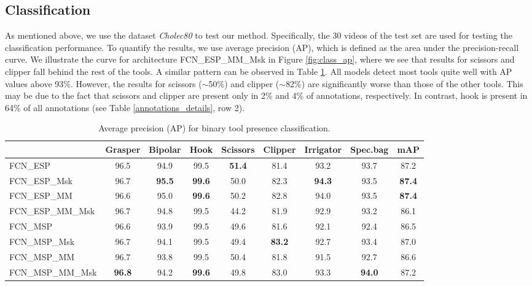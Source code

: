 \documentclass[english,runningheads,a4paper]{llncs}
\begin{document}
\subsection{Classification}
As mentioned above, we use the dataset \textit{Cholec80} to test our method. Specifically, the 30 videos of the test set are used for testing the classification performance. 
To quantify the results, we use average precision (AP), which is defined as the area under the precision-recall curve. We illustrate the curve for architecture FCN\_ESP\_MM\_Msk in Figure \ref{fig:class_ap}, where we see that results for scissors and clipper fall behind the rest of the tools.
A similar pattern can be observed in Table \ref{tab:class_ap}. All models detect most tools quite well with AP values above 93\%. However, the results for scissors ($\sim$50\%) and clipper ($\sim$82\%) are significantly worse than those of the other tools. This may be due to the fact that scissors and clipper are present only in 2\% and 4\% of annotations, respectively. In contrast, hook is present in 64\% of all annotations (see Table \ref{annotations_details}, row 2).
\begin{table}[t]
\centering
\begin{tabular}{|l|c|c|c|c|c|c|c|c|}
\hline
             & Grasper & Bipolar & Hook & Scissors & Clipper & Irrigator & Spec.bag & \textbf{mAP} \\ \hline
FCN\_ESP           & 96.5          & 94.9          & 99.5          & \textbf{51.4} & 81.4          & 93.2          & 93.7          & 87.2 \\ \hline
FCN\_ESP\_Msk     & 96.7          & \textbf{95.5} & \textbf{99.6} & 50.0          & 82.3          & \textbf{94.3} & 93.5          & \textbf{87.4} \\ \hline
FCN\_ESP\_MM       & 96.6          & 95.0          & \textbf{99.6} & 50.2          & 82.8          & 94.0          & 93.5          & \textbf{87.4} \\ \hline
FCN\_ESP\_MM\_Msk & 96.7          & 94.8          & 99.5          & 44.2          & 81.9          & 92.9          & 93.2          & 86.1 \\ \hline
FCN\_MSP           & 96.6          & 93.9          & 99.5          & 49.6          & 81.6          & 92.1          & 92.4          & 86.5 \\ \hline
FCN\_MSP\_Msk     & 96.7          & 94.1          & 99.5          & 49.4          & \textbf{83.2} & 92.7          & 93.4          & 87.0 \\ \hline
FCN\_MSP\_MM       & 96.7          & 93.8          & 99.5          & 50.4          & 81.8          & 91.5          & 92.7          & 86.6 \\ \hline
FCN\_MSP\_MM\_Msk & \textbf{96.8} & 94.2          & \textbf{99.6} & 49.8          & 83.0          & 93.3          & \textbf{94.0} & 87.2 \\ \hline
\end{tabular}
\smallskip
\caption{Average precision (AP) for binary tool presence classification.}
\label{tab:class_ap}
\end{table}
\end{document}
